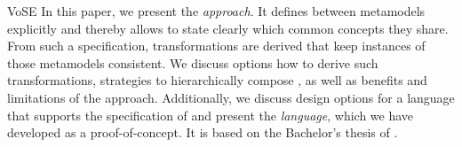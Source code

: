 \begin{copiedFrom}{VoSE}
In this paper, we present the \emph{\commonalities approach}. %
It defines \commonalities between metamodels explicitly and thereby allows to state clearly which common concepts they share.
From such a specification, transformations are derived that keep instances of those metamodels consistent.
We discuss options how to derive such transformations, strategies to hierarchically compose \commonalities, as well as benefits and limitations of the approach.
Additionally, we discuss design options for a language that supports the specification of \commonalities and present the \emph{\commonalities language}, which we have developed as a proof-of-concept.
It is based on the Bachelor's thesis of \textcite{gleitze2017a}. 



\end{copiedFrom}
